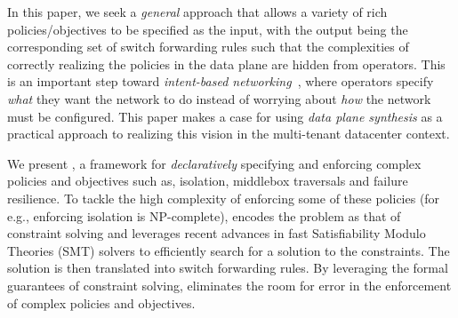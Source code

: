 

In this paper, we seek a {\em general} approach that allows a variety
of rich policies/objectives to be specified as the input, with the output being
the corresponding set of switch forwarding rules such that the
complexities of correctly realizing the policies in the data plane are
hidden from operators. This is an important step toward {\em
  intent-based networking}~\cite{intent}, where operators specify {\em
  what} they want the network to do instead of worrying about {\em
  how} the network must be configured.
This paper makes a case for using \emph{data plane synthesis} as a
practical approach to realizing this vision in the multi-tenant
datacenter context.

We present \Name, a framework for {\em declaratively} specifying and
enforcing complex policies and objectives such as, isolation,
middlebox traversals and failure resilience. To tackle the high
complexity of enforcing some of these policies (for e.g., enforcing
isolation is NP-complete), \Name encodes the problem as that of
constraint solving and leverages recent advances in fast
Satisfiability Modulo Theories (SMT) solvers to efficiently search for
a solution to the constraints.  The solution is then translated into
switch forwarding rules.
By leveraging the formal guarantees of constraint solving, \Name
eliminates the room for error in the enforcement of complex
policies and objectives.

